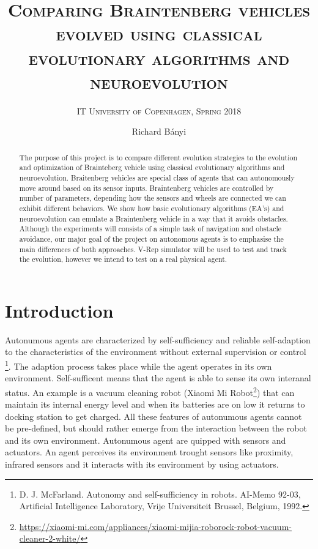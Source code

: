\documentclass[format=acmsmall, review=false, screen=true]{acmart}
\author{Richard Bányi}
\title{\textsc{Comparing Braintenberg vehicles evolved using classical evolutionary algorithms and neuroevolution}}
\subtitle{\textsc{IT University of Copenhagen, Spring 2018}}
\begin{document}
\begin{abstract}
The purpose of this project is to compare different evolution strategies to the evolution and optimization of Brainteberg vehicle using classical evolutionary algorithms and neuroevolution. Braitenberg vehicles are special class of agents that can autonomously move around based on its sensor inputs. Braintenberg vehicles are controlled by number of parameters, depending how the sensors and wheels are connected we can exhibit different behaviors. We show how basic evolutionary algorithms (EA’s) and neuroevolution can emulate a Braintenberg vehicle in a way that it avoids obstacles. Although the experiments will consists of a simple task of navigation and obstacle avoidance, our major goal of the project on autonomous agents is to emphasise the main differences  of both approaches. V-Rep simulator will be used to test and track the evolution, however we intend to test on a real physical agent.
	\end{abstract}
\maketitle


\section{Introduction}

Autonumous agents are characterized by self-sufficiency and reliable self-adaption to the characteristics of the environment without external supervision or control \footnote{D. J. McFarland. Autonomy and self-sufficiency in robots. AI-Memo 92-03, Artificial Intelligence Laboratory, Vrije Universiteit Brussel, Belgium, 1992.}. The adaption process takes place while the agent operates in its own environment. Self-sufficent means that the agent is able to sense its own interanal status. An example is a vacuum cleaning robot (Xiaomi Mi Robot\footnote{\url{https://xiaomi-mi.com/appliances/xiaomi-mijia-roborock-robot-vacuum-cleaner-2-white/}}) that can maintain its internal energy level and when its batteries are on low it returns to docking station to get charged. All these features of autonumous agents cannot be pre-defined, but should rather emerge from the interaction between the robot and its own environment. Autonumous agent are quipped with sensors and actuators. An agent perceives its environment trought sensors like proximity, infrared sensors and it interacts with its environment by using actuators. 
\end{document}
